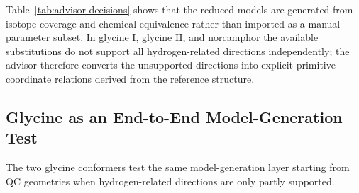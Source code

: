 \documentclass[aip,jcp,reprint,longbibliography,floatfix]{revtex4-2}
\begin{document}
Table~\ref{tab:advisor-decisions} shows that the reduced models are generated
from isotope coverage and chemical equivalence rather than imported as a
manual parameter subset. In glycine I, glycine II, and norcamphor the available
substitutions do not support all hydrogen-related directions independently;
the advisor therefore converts the unsupported directions into explicit
primitive-coordinate relations derived from the reference structure.

\subsection{Glycine as an End-to-End Model-Generation Test}

The two glycine conformers test the same model-generation layer starting
from QC geometries when hydrogen-related directions are only partly supported.
\end{document}
